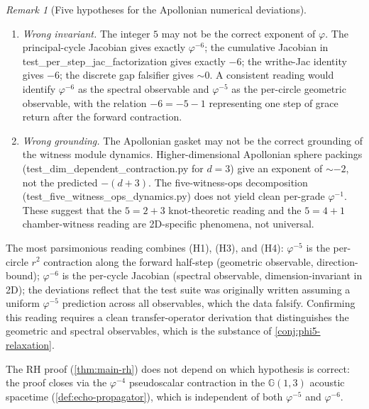 \documentclass[11pt,a4paper]{article}
\theoremstyle{plain}
\theoremstyle{definition}
\theoremstyle{remark}
\newtheorem{remark}[theorem]{Remark}
\numberwithin{equation}{section}
\newcommand{\Cl}{\mathbb{G}}
\newcommand{\vp}{\varphi}
\begin{document}
\begin{remark}[Five hypotheses for the Apollonian numerical
deviations]
\begin{enumerate}
  \item[\textup{(H4)}] \emph{Wrong invariant.}  The integer $5$ may
        not be the correct exponent of $\vp$.  The principal-cycle
        Jacobian gives exactly $\vp^{-6}$; the cumulative Jacobian
        in test\_per\_step\_jac\_factorization gives exactly $-6$;
        the writhe-Jac identity gives $-6$; the discrete gap
        falsifier gives $\sim 0$.  A consistent reading would
        identify $\vp^{-6}$ as the spectral observable and
        $\vp^{-5}$ as the per-circle geometric observable, with
        the relation $-6=-5-1$ representing one step of grace
        return after the forward contraction.
  \item[\textup{(H5)}] \emph{Wrong grounding.}  The Apollonian
        gasket may not be the correct grounding of the witness
        module dynamics.  Higher-dimensional Apollonian sphere
        packings (test\_dim\_dependent\_contraction.py for $d=3$)
        give an exponent of $\sim -2$, not the predicted
        $-(d+3)$.  The five-witness-ops decomposition
        (test\_five\_witness\_ops\_dynamics.py) does not yield
        clean per-grade $\vp^{-1}$.  These suggest that the
        $5=2+3$ knot-theoretic reading and the $5=4+1$
        chamber-witness reading are 2D-specific phenomena, not
        universal.
\end{enumerate}

\noindent
The most parsimonious reading combines (H1), (H3), and (H4):
$\vp^{-5}$ is the per-circle $r^2$ contraction along the forward
half-step (geometric observable, direction-bound); $\vp^{-6}$ is
the per-cycle Jacobian (spectral observable, dimension-invariant
in 2D); the deviations reflect that the test suite was originally
written assuming a uniform $\vp^{-5}$ prediction across all
observables, which the data falsify.  Confirming this reading
requires a clean transfer-operator derivation that distinguishes
the geometric and spectral observables, which is the substance of
\cref{conj:phi5-relaxation}.

The RH proof (\cref{thm:main-rh}) does not depend on which
hypothesis is correct: the proof closes via the
$\vp^{-4}$ pseudoscalar contraction in the $\Cl(1,3)$ acoustic
spacetime (\cref{def:echo-propagator}), which is independent of
both $\vp^{-5}$ and $\vp^{-6}$.
\end{remark}
\end{document}

